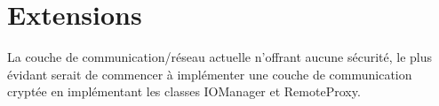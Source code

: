 \chapter{Extensions}

La couche de communication/réseau actuelle n'offrant aucune sécurité, le plus évidant serait de commencer à implémenter une couche de communication cryptée en implémentant les classes IOManager et RemoteProxy.

